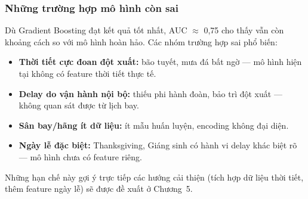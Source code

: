 \subsubsection{Những trường hợp mô hình còn sai}

Dù Gradient Boosting đạt kết quả tốt nhất, AUC $\approx$ 0,75 cho thấy
vẫn còn khoảng cách so với mô hình hoàn hảo.
Các nhóm trường hợp sai phổ biến:

\begin{itemize}
    \item \textbf{Thời tiết cực đoan đột xuất:} bão tuyết, mưa đá bất ngờ ---
          mô hình hiện tại không có feature thời tiết thực tế.

    \item \textbf{Delay do vận hành nội bộ:} thiếu phi hành đoàn, bảo trì đột xuất ---
          không quan sát được từ lịch bay.

    \item \textbf{Sân bay/hãng ít dữ liệu:} ít mẫu huấn luyện, encoding không đại diện.

    \item \textbf{Ngày lễ đặc biệt:} Thanksgiving, Giáng sinh có hành vi delay
          khác biệt rõ --- mô hình chưa có feature riêng.
\end{itemize}

Những hạn chế này gợi ý trực tiếp các hướng cải thiện
(tích hợp dữ liệu thời tiết, thêm feature ngày lễ)
sẽ được đề xuất ở Chương~5.
